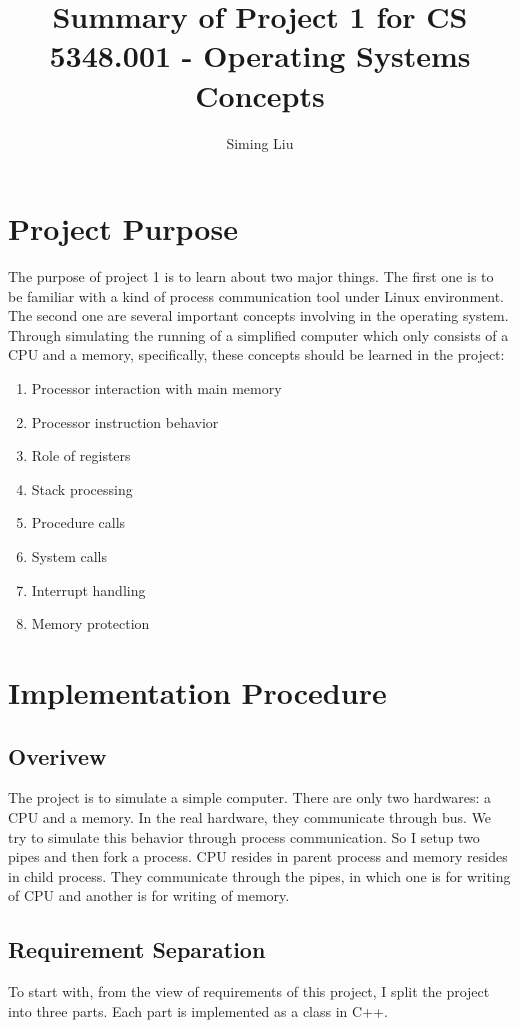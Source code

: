 \documentclass[a4paper]{report}
\begin{document}
\title{Summary of Project 1 for CS 5348.001 - Operating Systems Concepts}

\author{Siming Liu}

\maketitle{}

\section*{Project Purpose}
The purpose of project 1 is to learn about two major things. The first one is to be familiar with a kind of process communication tool under Linux environment. The second one are several important concepts involving in the operating system. Through simulating the running of a simplified computer which only consists of a CPU and a memory, specifically, these concepts should be learned in the project:
\begin{enumerate}[label=\textbf{\textit{\alph*}})]
  \item Processor interaction with main memory
  \item Processor instruction behavior
  \item Role of registers
  \item Stack processing
  \item Procedure calls
  \item System calls
  \item Interrupt handling
  \item Memory protection
\end{enumerate}

\section*{Implementation Procedure}
\subsection*{Overivew}
The project is to simulate a simple computer. There are only two hardwares: a CPU and a memory. In the real hardware, they communicate through bus. We try to simulate this behavior through process communication. So I setup two pipes and then fork a process. CPU resides in parent process and memory resides in child process. They communicate through the pipes, in which one is for writing of CPU and another is for writing of memory.

\subsection*{Requirement Separation}
To start with, from the view of requirements of this project, I split the project into three parts. Each part is implemented as a class in C++.
\end{document}
